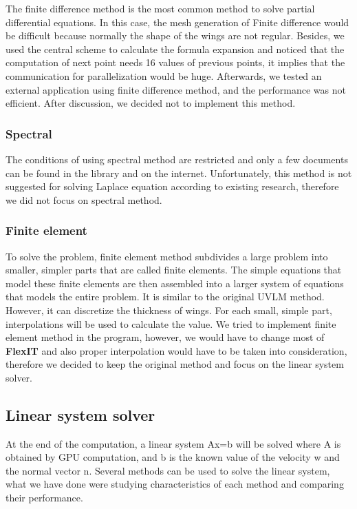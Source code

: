 \documentclass[a4paper, 11pt, article]{report}
\begin{document}
The finite difference method is the most common method to solve partial differential equations. In this case, the mesh generation of Finite difference would be difficult because normally the shape of the wings are not regular. Besides, we used the central scheme to calculate the formula expansion and noticed that the computation of next point needs 16 values of previous points, it implies that the communication for parallelization would be huge. Afterwards, we tested an external application using finite difference method, and the performance was not efficient. After discussion, we decided not to implement this method.

\subsubsection{Spectral} 

The conditions of using spectral method are restricted and only a few documents can be found in the library and on the internet. Unfortunately, this method is not suggested for solving Laplace equation according to existing research, therefore we did not focus on spectral method.

\subsubsection{Finite element}

To solve the problem, finite element method subdivides a large problem into smaller, simpler parts that are called finite elements. The simple equations that model these finite elements are then assembled into a larger system of equations that models the entire problem. It is similar to the original UVLM method. However, it can discretize the thickness of wings. For each small, simple part, interpolations will be used to calculate the value. We tried to implement finite element method in the program, however, we would have to change most of \textbf{FlexIT} and also proper interpolation would have to be taken into consideration, therefore we decided to keep the original method and focus on the linear system solver.

\subsection{Linear system solver}

At the end of the computation, a linear system Ax=b will be solved where A is obtained by GPU computation, and b is the known value of the velocity w and the normal vector n. Several methods can be used to solve the linear system, what we have done were studying characteristics of each method and comparing their performance.
\end{document}
